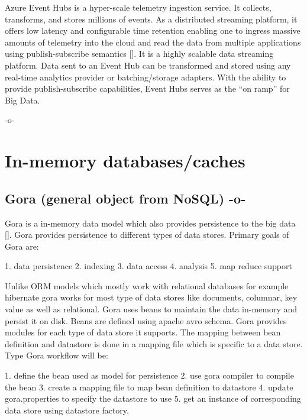 Azure Event Hubs is a hyper-scale telemetry ingestion service. It
collects, transforms, and stores millions of events. As a distributed
streaming platform, it offers low latency and configurable time
retention enabling one to ingress massive amounts of telemetry into
the cloud and read the data from multiple applications using
publish-subscribe semantics [\cite{www-eventhubs}]. It is a highly
scalable data streaming platform. Data sent to an Event Hub can be
transformed and stored using any real-time analytics provider or
batching/storage adapters. With the ability to provide
publish-subscribe capabilities, Event Hubs serves as the ``on ramp''
for Big Data.

     -o-

\section{In-memory databases/caches}
\label{S:o-db-memory}


\subsection{Gora (general object from NoSQL) -o-}

Gora is a in-memory data model which also provides persistence to the
big data [\cite{www-gora}].  Gora provides persistence to different
types of data stores. Primary goals of Gora are:

     1. data persistence
     2. indexing
     3. data access
     4. analysis
     5. map reduce support

Unlike ORM models which mostly work with relational databases for
example hibernate gora works for most type of data stores like
documents, columnar, key value as well as relational. Gora uses beans
to maintain the data in-memory and persist it on disk. Beans are
defined using apache avro schema. Gora provides modules for each type
of data store it supports.  The mapping between bean definition and
datastore is done in a mapping file which is specific to a data store.
Type Gora workflow will be:

     1. define  the bean used as model for persistence
     2. use gora compiler to compile the bean
     3. create a mapping file to map bean definition to datastore
     4. update gora.properties to specify the datastore to use
     5. get an instance of corresponding data store using datastore factory.


